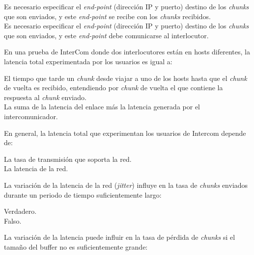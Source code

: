 \documentclass[legalpaper, 12pt, addpoints]{exam}
\begin{document}
\begin{questions}
\begin{oneparchoices}
  \choice Es necesario especificar el \emph{end-point} (dirección IP y puerto) destino de los \emph{chunks} que son enviados, y este \emph{end-point} se recibe con los \emph{chunks} recibidos.\\
  \choice Es necesario especificar el \emph{end-point} (dirección IP y puerto) destino de los \emph{chunks} que son enviados, y este \emph{end-point} debe comunicarse al interlocutor.
\end{oneparchoices}

\vspace{0.10in}

\question En una prueba de InterCom donde dos interlocutores están en
hosts diferentes, la latencia total experimentada por los usuarios es
igual a:

\begin{oneparchoices}
  \choice El tiempo que tarde un \emph{chunk} desde viajar a uno de los hosts hasta que el \emph{chunk} de vuelta es recibido, entendiendo por \emph{chunk} de vuelta el que contiene la respuesta al \emph{chunk} enviado.\\
  \choice La suma de la latencia del enlace más la latencia generada por el intercomunicador.
\end{oneparchoices}
  
\vspace{0.10in}

\question En general, la latencia total que experimentan los usuarios
de Intercom depende de:

\begin{oneparchoices}
  \choice La tasa de transmisión que soporta la red.\\
  \choice La latencia de la red.
\end{oneparchoices}
  
\vspace{0.10in}

\question La variación de la latencia de la red (\emph{jitter})
influye en la tasa de \emph{chunks} enviados durante un periodo de
tiempo suficientemente largo:

\begin{oneparchoices}
  \choice Verdadero.\\
  \choice Falso.
\end{oneparchoices}
  
\vspace{0.10in}

\question La variación de la latencia puede influir en la tasa de
pérdida de \emph{chunks} si el tamaño del buffer no es suficientemente
grande:


\end{questions}
\end{document}
